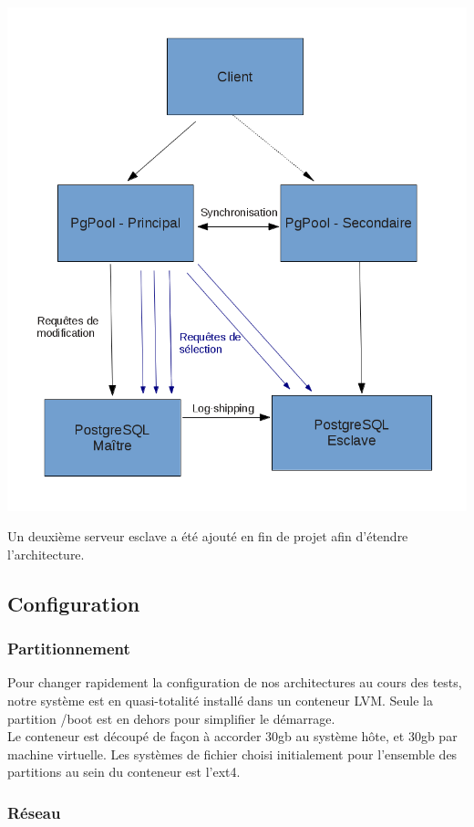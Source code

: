 \documentclass[12pt]{report}
\begin{document}
\includegraphics[width=\linewidth]{./arch.png}

Un deuxième serveur esclave a été ajouté en fin de projet afin d'étendre
l'architecture.

\subsection{Configuration}

\subsubsection{Partitionnement}

Pour changer rapidement la configuration de nos architectures au cours des tests,
notre système est en quasi-totalité installé dans un conteneur LVM. Seule la partition 
/boot est en dehors pour simplifier le démarrage.\\


Le conteneur est découpé de façon à accorder 30gb au système hôte, et 30gb par machine
virtuelle. Les systèmes de fichier choisi initialement pour l’ensemble des partitions
au sein du conteneur est l’ext4.\\

\subsubsection{Réseau}
\end{document}
